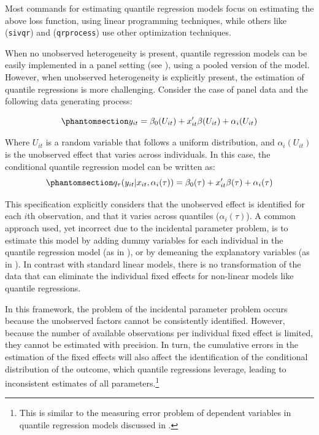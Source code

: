 \documentclass[bib]{statapress}
\begin{document}
Most commands for estimating quantile regression models focus on
estimating the above loss function, using linear programming techniques,
while others like \citet{kaplan2017} (\texttt{sivqr}) and
\citet{chernozhukov2022} (\texttt{qrprocess}) use other optimization
techniques.

When no unobserved heterogeneity is present, quantile regression models
can be easily implemented in a panel setting (see
\citet{wooldridge2010}), using a pooled version of the model. However,
when unobserved heterogeneity is explicitly present, the estimation of
quantile regressions is more challenging. Consider the case of panel
data and the following data generating process:

\begin{equation}\phantomsection\label{eq-dgp-panel}{y_{it} = \beta_0(U_{it}) + x_{it}'\beta(U_{it}) + \alpha_i(U_{it})
}\end{equation}

Where \(U_{it}\) is a random variable that follows a uniform
distribution, and \(\alpha_i(U_{it})\) is the unobserved effect that
varies across individuals. In this case, the conditional quantile
regression model can be written as:
\begin{equation}\phantomsection\label{eq-feqr}{q_\tau(y_{it}|x_{it},\alpha_i(\tau))=\beta_0(\tau) + x_{it}'\beta(\tau)+\alpha_i(\tau) 
}\end{equation}

This specification explicitly considers that the unobserved effect is
identified for each \(i\)th observation, and that it varies across
quantiles (\(\alpha_i(\tau)\)). A common approach used, yet incorrect
due to the incidental parameter problem, is to estimate this model by
adding dummy variables for each individual in the quantile regression
model (as in \citet{budig2001}), or by demeaning the explanatory
variables (as in \citet{budig2010}). In contrast with standard linear
models, there is no transformation of the data that can eliminate the
individual fixed effects for non-linear models like quantile
regressions.

In this framework, the problem of the incidental parameter problem
occurs because the unobserved factors cannot be consistently identified.
However, because the number of available observations per individual
fixed effect is limited, they cannot be estimated with precision. In
turn, the cumulative errors in the estimation of the fixed effects will
also affect the identification of the conditional distribution of the
outcome, which quantile regressions leverage, leading to inconsistent
estimates of all parameters.\footnote{This is similar to the measuring
  error problem of dependent variables in quantile regression models
  discussed in \citet{hausman2021}.}
\end{document}
